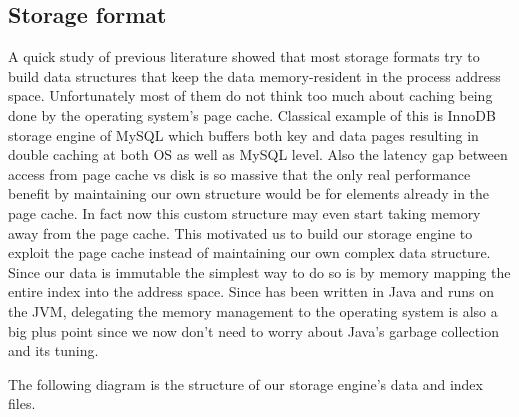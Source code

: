 \documentclass[10pt,twocolumn,preprint,natbib,authoryear]{sigplanconf}
\begin{document}

\subsection{Storage format}
\label{sec:read_only:storage_format}

A quick study of previous literature showed that most storage formats try to build data structures that keep the data memory-resident in the process address space. Unfortunately most of them do not think too much about caching being done by the operating system's page cache. Classical example of this is InnoDB storage engine of MySQL which buffers both key and data pages resulting in double caching 
at both OS as well as MySQL level. Also the latency gap between access from page cache vs disk is so massive that the only real performance benefit by maintaining our own structure would be for elements already in the page cache. In fact now this custom structure may even start taking memory away from the page cache. This motivated us to build our storage engine to exploit the page cache instead of maintaining our own complex data structure. Since our data is immutable the simplest way to do so is by memory mapping the entire index into the address space. Since \projectname{} has been written in Java and runs on the JVM, delegating the memory management to the operating system is also a big plus point since we now don't need to worry about Java's garbage collection and its tuning.

The following diagram is the structure of our storage engine's data and index files. 
\end{document}
